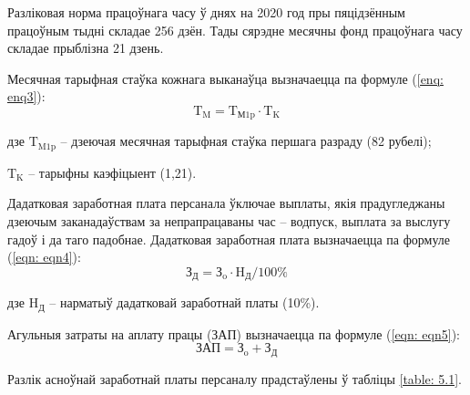 Разліковая норма працоўнага часу ў днях на 2020 год пры пяцідзённым працоўным тыдні складае 256 дзён. Тады сярэдне месячны фонд працоўнага часу складае прыблізна 21 дзень.

Месячная тарыфная стаўка кожнага выканаўца вызначаецца па
формуле (\ref{enq: enq3}):
\begin{equation}
    \label{enq: enq3}
    \text{T}_\text{M} = \text{T}_\text{М1p} \cdot \text{T}_\text{K}
\end{equation}
\begin{Explanation}
    \item[дзе] $\text{T}_\text{M1p}$ -- дзеючая месячная тарыфная стаўка першага разраду (82 рубелі);
    \item $\text{T}_\text{K}$ -- тарыфны каэфіцыент (1,21).
\end{Explanation}

Дадатковая заработная плата персанала ўключае выплаты, якія
прадугледжаны дзеючым заканадаўствам за непрапрацаваны час --
водпуск, выплата за выслугу гадоў і да таго падобнае.
Дадатковая заработная плата вызначаецца па формуле (\ref{eqn: eqn4}):
\begin{equation}
    \label{eqn: eqn4}
    \text{З}_\text{Д} = \text{З}_\text{o} \cdot \text{H}_\text{Д} / 100\%
\end{equation}
\begin{Explanation}
    \item[дзе] $\text{H}_\text{Д}$ -- нарматыў дадатковай заработнай платы (10\%).
\end{Explanation}

Агульныя затраты на аплату працы (ЗАП) вызначаецца па формуле
(\ref{eqn: eqn5}):
\begin{equation}
    \label{eqn: eqn5}
    \text{ЗАП} = \text{З}_\text{o} + \text{З}_\text{Д}
\end{equation}

Разлік асноўнай заработнай платы персаналу прадстаўлены ў табліцы
\ref{table: 5.1}.

